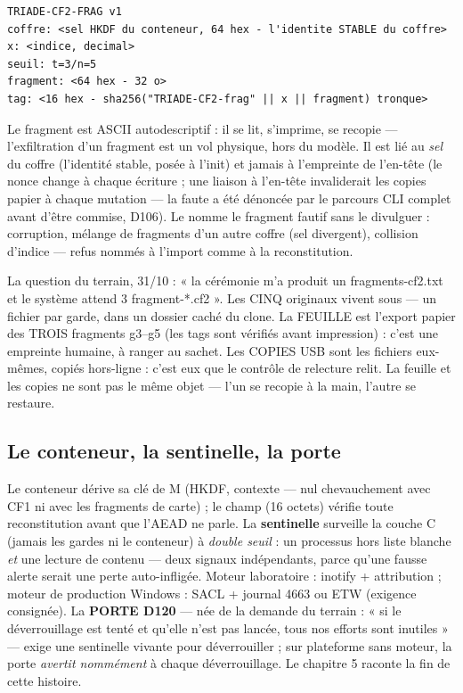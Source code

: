 \begin{lstlisting}
TRIADE-CF2-FRAG v1
coffre: <sel HKDF du conteneur, 64 hex - l'identite STABLE du coffre>
x: <indice, decimal>
seuil: t=3/n=5
fragment: <64 hex - 32 o>
tag: <16 hex - sha256("TRIADE-CF2-frag" || x || fragment) tronque>
\end{lstlisting}

Le fragment est ASCII autodescriptif : il se lit, s'imprime, se recopie — l'exfiltration
d'un fragment est un vol physique, hors du modèle. Il est lié au \emph{sel} du coffre
(l'identité stable, posée à l'init) et jamais à l'empreinte de l'en-tête (le nonce
change à chaque écriture ; une liaison à l'en-tête invaliderait les copies papier à
chaque mutation — la faute a été dénoncée par le parcours CLI complet avant d'être
commise, D106). Le  nomme le fragment fautif sans le divulguer : corruption,
mélange de fragments d'un autre coffre (sel divergent), collision d'indice — refus
nommés à l'import comme à la reconstitution.

\begin{terrain}
La question du terrain, 31/10 : « la cérémonie m'a produit un fragments-cf2.txt et le
système attend 3 fragment-*.cf2 ». Les CINQ originaux vivent sous
 — un fichier par garde, dans un dossier caché du clone. La FEUILLE
est l'export papier des TROIS fragments g3--g5 (les tags sont vérifiés avant
impression) : c'est une empreinte humaine, à ranger au sachet. Les COPIES USB sont les
fichiers  eux-mêmes, copiés hors-ligne : c'est eux que le contrôle de
relecture relit. La feuille et les copies ne sont pas le même objet — l'un se recopie
à la main, l'autre se restaure.
\end{terrain}

\subsection{Le conteneur, la sentinelle, la porte}

Le conteneur  dérive sa clé de M (HKDF, contexte  —
nul chevauchement avec CF1 ni avec les fragments de carte) ; le champ 
(16 octets) vérifie toute reconstitution avant que l'AEAD ne parle. La
\textbf{sentinelle} surveille la couche C (jamais les gardes ni le conteneur) à
\emph{double seuil} : un processus hors liste blanche \emph{et} une lecture de
contenu — deux signaux indépendants, parce qu'une fausse alerte serait une perte
auto-infligée. Moteur laboratoire : inotify + attribution  ; moteur de
production Windows : SACL + journal 4663 ou ETW (exigence consignée). La
\textbf{PORTE D120} — née de la demande du terrain : « si le déverrouillage est tenté
et qu'elle n'est pas lancée, tous nos efforts sont inutiles » — exige une sentinelle
vivante pour déverrouiller ; sur plateforme sans moteur, la porte \emph{avertit
nommément} à chaque déverrouillage. Le chapitre 5 raconte la fin de cette histoire.


